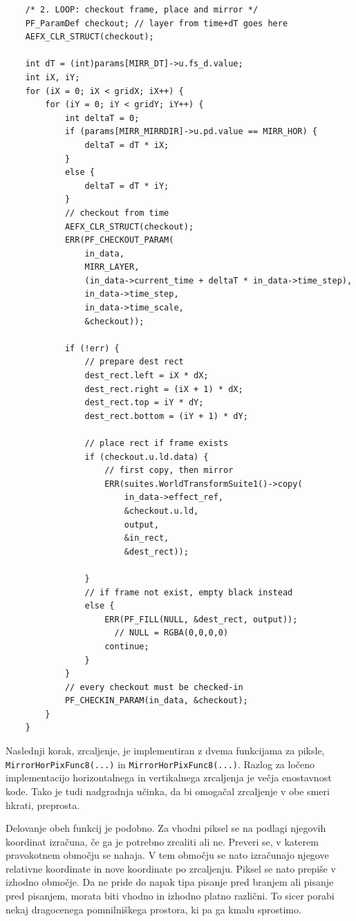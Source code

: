 \documentclass[a4paper, 12pt]{book}
\begin{document}
\begin{verbatim}
    /* 2. LOOP: checkout frame, place and mirror */
    PF_ParamDef checkout; // layer from time+dT goes here
    AEFX_CLR_STRUCT(checkout);

    int dT = (int)params[MIRR_DT]->u.fs_d.value;
    int iX, iY;
    for (iX = 0; iX < gridX; iX++) { 
        for (iY = 0; iY < gridY; iY++) { 
            int deltaT = 0;
            if (params[MIRR_MIRRDIR]->u.pd.value == MIRR_HOR) {
                deltaT = dT * iX;
            }
            else {
                deltaT = dT * iY;
            }
            // checkout from time
            AEFX_CLR_STRUCT(checkout);
            ERR(PF_CHECKOUT_PARAM(
                in_data,
                MIRR_LAYER,
                (in_data->current_time + deltaT * in_data->time_step),
                in_data->time_step,
                in_data->time_scale,
                &checkout));

            if (!err) {
                // prepare dest rect
                dest_rect.left = iX * dX;
                dest_rect.right = (iX + 1) * dX;
                dest_rect.top = iY * dY;
                dest_rect.bottom = (iY + 1) * dY;

                // place rect if frame exists
                if (checkout.u.ld.data) {
                    // first copy, then mirror
                    ERR(suites.WorldTransformSuite1()->copy(
                        in_data->effect_ref,
                        &checkout.u.ld,
                        output,
                        &in_rect,
                        &dest_rect));
                    
                }
                // if frame not exist, empty black instead
                else {
                    ERR(PF_FILL(NULL, &dest_rect, output)); 
                      // NULL = RGBA(0,0,0,0)
                    continue;
                }
            }
            // every checkout must be checked-in
            PF_CHECKIN_PARAM(in_data, &checkout);
        }
    }
\end{verbatim}

Naslednji korak, zrcaljenje, je implementiran z dvema funkcijama za piksle, \texttt{MirrorHorPixFunc8(...)} in \texttt{MirrorHorPixFunc8(...)}.
Razlog za ločeno implementacijo horizontalnega in vertikalnega zrcaljenja je večja enostavnost kode.
Tako je tudi nadgradnja učinka, da bi omogačal zrcaljenje v obe smeri hkrati, preprosta.

Delovanje obeh funkcij je podobno.
Za vhodni piksel se na podlagi njegovih koordinat izračuna, če ga je potrebno zrcaliti ali ne.
Preveri se, v katerem pravokotnem območju se nahaja.
V tem območju se nato izračunajo njegove relativne koordinate in nove koordinate po zrcaljenju.
Piksel se nato prepiše v izhodno območje. 
Da ne pride do napak tipa pisanje pred branjem ali pisanje pred pisanjem, morata biti vhodno in izhodno platno različni.
To sicer porabi nekaj dragocenega pomnilniškega prostora, ki pa ga kmalu sprostimo.
\end{document}
